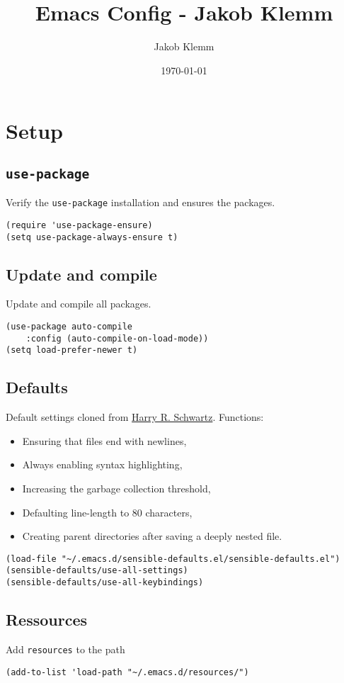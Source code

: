 \documentclass[11pt]{article}
\author{Jakob Klemm}
\date{\today}
\title{Emacs Config - Jakob Klemm}
\begin{document}
\maketitle
\section*{Setup}
\label{sec:org167863c}
\subsection*{\texttt{use-package}}
\label{sec:org5b32dc4}
Verify the \texttt{use-package} installation and ensures the packages.
\begin{verbatim}
(require 'use-package-ensure)
(setq use-package-always-ensure t)
\end{verbatim}
\subsection*{Update and compile}
\label{sec:orgdb09945}
Update and compile all packages.
\begin{verbatim}
(use-package auto-compile
	:config (auto-compile-on-load-mode))
(setq load-prefer-newer t)
\end{verbatim}
\subsection*{Defaults}
\label{sec:org723e27a}
Default settings cloned from \href{https://github.com/hrs/sensible-defaults.el}{Harry R. Schwartz}.
Functions:
\begin{itemize}
\item Ensuring that files end with newlines,
\item Always enabling syntax highlighting,
\item Increasing the garbage collection threshold,
\item Defaulting line-length to 80 characters,
\item Creating parent directories after saving a deeply nested file.
\end{itemize}
\begin{verbatim}
(load-file "~/.emacs.d/sensible-defaults.el/sensible-defaults.el")
(sensible-defaults/use-all-settings)
(sensible-defaults/use-all-keybindings)
\end{verbatim}
\subsection*{Ressources}
\label{sec:orge1cc021}
Add \texttt{resources} to the path
\begin{verbatim}
(add-to-list 'load-path "~/.emacs.d/resources/")
\end{verbatim}
\end{document}
